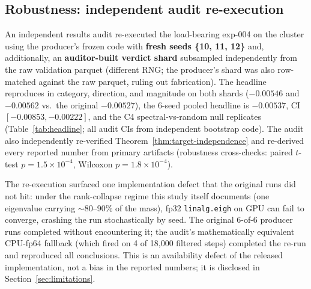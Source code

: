 \subsection{Robustness: independent audit re-execution}
\label{sec:robustness}

An independent results audit re-executed the load-bearing exp-004 on the
cluster using the producer's frozen code with \textbf{fresh seeds
\{10, 11, 12\}} and, additionally, an \textbf{auditor-built verdict shard}
subsampled independently from the raw validation parquet (different RNG;
the producer's shard was also row-matched against the raw parquet, ruling
out fabrication). The headline reproduces in category, direction, and
magnitude on both shards ($-0.00546$ and $-0.00562$ vs.\ the original
$-0.00527$), the 6-seed pooled headline is $-0.00537$, CI
$[-0.00853, -0.00222]$, and the C4 spectral-vs-random null replicates
(Table~\ref{tab:headline}; all audit CIs from independent bootstrap code).
The audit also independently re-verified Theorem~\ref{thm:target-independence}
and re-derived every reported number from primary artifacts (robustness
cross-checks: paired $t$-test $p = 1.5\times10^{-4}$, Wilcoxon
$p = 1.8\times10^{-4}$).

The re-execution surfaced one implementation defect that the original runs
did not hit: under the rank-collapse regime this study itself documents
(one eigenvalue carrying $\sim$80--90\% of the mass), fp32
\texttt{linalg.eigh} on GPU can fail to converge, crashing the run
stochastically by seed. The original 6-of-6 producer runs completed without
encountering it; the audit's mathematically equivalent CPU-fp64 fallback
(which fired on 4 of 18{,}000 filtered steps) completed the re-run and
reproduced all conclusions. This is an availability defect of the released
implementation, not a bias in the reported numbers; it is disclosed in
Section~\ref{sec:limitations}.
